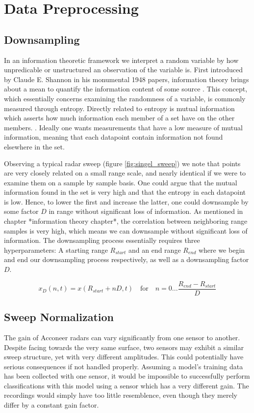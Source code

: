 \section{Data Preprocessing}
\subsection{Downsampling}

In an information theoretic framework we interpret a random variable by how unpredicable or unstructured an observation of the variable is\citep{anderson_johnnesson_2006}. First introduced by Claude E. Shannon in his monumental 1948 papers, information theory brings about a mean to quantify the information content of some source \citep{shannon_1948}. This concept, which essentially concerns examining the randomness of a variable, is commonly measured through entropy. Directly related to entropy is mutual information which asserts how much information each member of a set have on the other members. \citep{hyvasrinen_karhunen_oja_2004}. Ideally one wants measurements that have a low measure of mutual information, meaning that each datapoint contain information not found elsewhere in the set. 

Observing a typical radar sweep (figure \ref{fig:singel_sweep}) we note that points are very closely related on a small range scale, and nearly identical if we were to examine them on a sample by sample basis. One could argue that the mutual information found in the set is very high and that the entropy in each datapoint is low. Hence, to lower the first and increase the latter, one could downsample by some factor $D$ in range without significant loss of information.
As mentioned in chapter *information theory chapter*, the correlation between neighboring range samples is very high, which means we can downsample without significant loss of information. The downsampling process essentially requires three hyperparameters: A starting range $R_{start}$ and an end range $R_{end}$ where we begin and end our downsampling process respectively, as well as a downsampling factor $D$.

\begin{equation}
	x_D(n, t) = x(R_{start} + nD, t) \quad \text{for}\quad n=0...\frac{R_{end}-R_{start}}{D}
\end{equation}

\subsection{Sweep Normalization}
The gain of Acconeer radars can vary significantly from one sensor to another. Despite facing towards the very same surface, two sensors may exhibit a similar sweep structure,  yet with very different amplitudes. This could potentially have serious consequences if not handled properly. Assuming a model's training data has been collected with one sensor, it would be impossible to successfully perform classifications with this model using a sensor which has a very different gain. The recordings would simply have too little resemblence, even though they merely differ by a constant gain factor.

